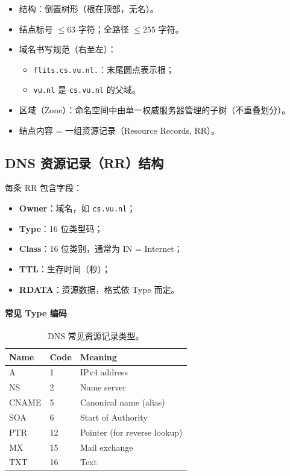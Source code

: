 \begin{itemize}
  \item 结构：倒置树形（根在顶部，无名）。
  \item 结点标号 \(\le 63\) 字符；全路径 \(\le 255\) 字符。
  \item 域名书写规范（右至左）：
  \begin{itemize}
    \item \texttt{flits.cs.vu.nl.}：末尾圆点表示根；
    \item \texttt{vu.nl} 是 \texttt{cs.vu.nl} 的父域。
  \end{itemize}
  \item 区域（Zone）：命名空间中由单一权威服务器管理的子树（不重叠划分）。
  \item 结点内容 = 一组资源记录（Resource Records, RR）。
\end{itemize}

\subsection{DNS 资源记录（RR）结构}

每条 RR 包含字段：
\begin{itemize}
  \item \textbf{Owner}：域名，如 \texttt{cs.vu.nl}；
  \item \textbf{Type}：16 位类型码；
  \item \textbf{Class}：16 位类别，通常为 IN = Internet；
  \item \textbf{TTL}：生存时间（秒）；
  \item \textbf{RDATA}：资源数据，格式依 Type 而定。
\end{itemize}

\paragraph{常见 Type 编码}
\begin{table}[H]
\centering
\begin{tabular}{@{}lll@{}}
\toprule
Name & Code & Meaning \\
\midrule
A & 1 & IPv4 address \\
NS & 2 & Name server \\
CNAME & 5 & Canonical name (alias) \\
SOA & 6 & Start of Authority \\
PTR & 12 & Pointer (for reverse lookup) \\
MX & 15 & Mail exchange \\
TXT & 16 & Text \\
\bottomrule
\end{tabular}
\caption{DNS 常见资源记录类型。}
\end{table}

